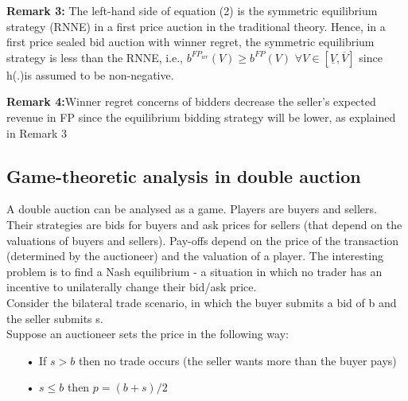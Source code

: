 \documentclass[10pt,a4paper,oneside]{report}
\begin{document}
\begin{flushleft}
\begin{flushleft}
\textbf{Remark 3:} The left-hand side of equation (2) is the symmetric equilibrium strategy (RNNE)
in a first price auction in the traditional theory. Hence, in a first price sealed bid auction with winner regret, the symmetric equilibrium strategy is less than the RNNE, i.e., $b^{{FP}_{wr}}(V)\geq b^{{FP}}(V)$  $\forall  V\in [\underline{V},\overline{V}]$ since h(.)is assumed to be non-negative.
\end{flushleft}
\begin{flushleft}
\textbf{Remark 4:}Winner regret concerns of bidders decrease the seller’s expected revenue in FP since the equilibrium bidding strategy will be lower, as explained in Remark 3
\end{flushleft}
\end{flushleft}

\subsection{Game-theoretic analysis in double auction}
A double auction can be analysed as a game. Players are buyers and sellers. Their strategies are bids for buyers and ask prices for sellers (that depend on the valuations of buyers and sellers). Pay-offs depend on the price of the transaction (determined by the auctioneer) and the valuation of a player. The interesting problem is to find a Nash equilibrium - a situation in which no trader has an incentive to unilaterally change their bid/ask price.\\
\noindent Consider the bilateral trade scenario, in which the buyer submits a bid of b and the seller submits s.\\
\noindent Suppose an auctioneer sets the price in the following way:\citep{dong2014double}
\begin{enumerate}
\item[\textbf{•}] If $s>b$ then no trade occurs (the seller wants more than the buyer pays)
\item[\textbf{•}] $ s\leq b$ then $p=(b+s)/2$
\end{enumerate}
 
\end{document}
